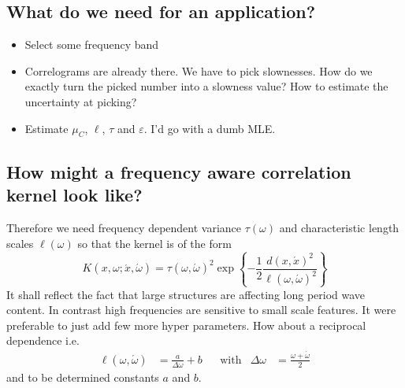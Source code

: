\documentclass[11pt]{article}
\begin{document}
\subsection{What do we need for an application?}

\begin{itemize}
    \item Select some frequency band
    \item Correlograms are already there. We have to pick slownesses. How do we exactly turn the picked number into a slowness value? How to estimate the uncertainty at picking?
    \item Estimate $\mu_C$, $\ell$, $\tau$ and $\varepsilon$. I'd go with a dumb MLE.
\end{itemize}

\subsection{How might a frequency aware correlation kernel look like?}

Therefore we need frequency dependent variance $\tau(\omega)$ and characteristic length scales $\ell(\omega)$ so that the kernel is of the form
\begin{equation}
    K(x,\omega;\acute x,\acute \omega) =
    \tau(\omega,\acute\omega)^2
    \exp\left\{-\frac12 \frac{d(x,\acute x)^2}{\ell(\omega,\acute\omega)^2}\right\}
\end{equation}
It shall reflect the fact that large structures are affecting long period wave content.
In contrast high frequencies are sensitive to small scale features.
It were preferable to just add few more hyper parameters.
How about a reciprocal dependence i.e.
\begin{align}
    \ell(\omega, \acute \omega) &= \frac a{\Delta \omega} + b &
    &\text{with}&
    \Delta \omega &= \frac{\omega + \acute\omega}2
\end{align}
and to be determined constants $a$ and $b$.

\printbibliography
\end{document}
